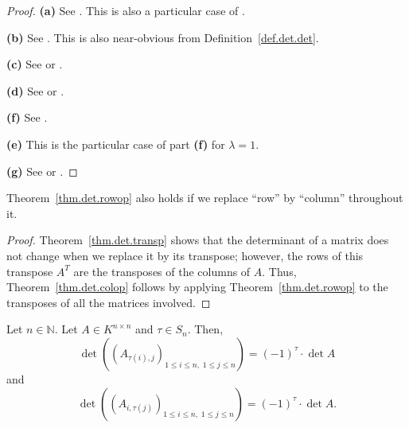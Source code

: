 \begin{proof}
\leanok
\textbf{(a)} See \cite[Exercise 6.7 \textbf{(a)}]{detnotes}. This is also a
particular case of \cite[Corollary B.19]{Strick13}.

\textbf{(b)} See \cite[Exercise 6.7 \textbf{(c)}]{detnotes}. This is also
near-obvious from Definition~\ref{def.det.det}.

\textbf{(c)} See \cite[Exercise 6.7 \textbf{(e)}]{detnotes} or
\cite[\S 5.3.3, property (iii)]{Laue-det}.

\textbf{(d)} See \cite[Exercise 6.7 \textbf{(g)}]{detnotes} or
\cite[\S 5.3.3, property (ii)]{Laue-det}.

\textbf{(f)} See \cite[Exercise 6.8 \textbf{(a)}]{detnotes}.

\textbf{(e)} This is the particular case of part \textbf{(f)} for $\lambda = 1$.

\textbf{(g)} See \cite[Exercise 6.7 \textbf{(i)}]{detnotes} or
\cite[\S 5.3.3, property (i)]{Laue-det}.
\end{proof}

\begin{theorem}
\label{thm.det.colop}
\leantarget
\leanok
Theorem~\ref{thm.det.rowop} also holds if we replace ``row'' by ``column''
throughout it.
\end{theorem}

\begin{proof}
\leanok
Theorem~\ref{thm.det.transp} shows that the determinant of a matrix does not
change when we replace it by its transpose; however, the rows of this
transpose $A^T$ are the transposes of the columns of $A$. Thus,
Theorem~\ref{thm.det.colop} follows by applying Theorem~\ref{thm.det.rowop}
to the transposes of all the matrices involved.
\end{proof}

\begin{corollary}
\label{cor.det.sig-row-col}
\leantarget
\leanok
Let $n \in \mathbb{N}$. Let $A \in K^{n \times n}$ and $\tau \in S_n$. Then,
\begin{equation}
  \det\left( \left( A_{\tau(i), j} \right)_{1 \leq i \leq n,\; 1 \leq j \leq n} \right)
  = (-1)^{\tau} \cdot \det A
  \label{eq.cor.det.sig-row-col.row}
\end{equation}
and
\begin{equation}
  \det\left( \left( A_{i, \tau(j)} \right)_{1 \leq i \leq n,\; 1 \leq j \leq n} \right)
  = (-1)^{\tau} \cdot \det A.
  \label{eq.cor.det.sig-row-col.col}
\end{equation}
\end{corollary}

